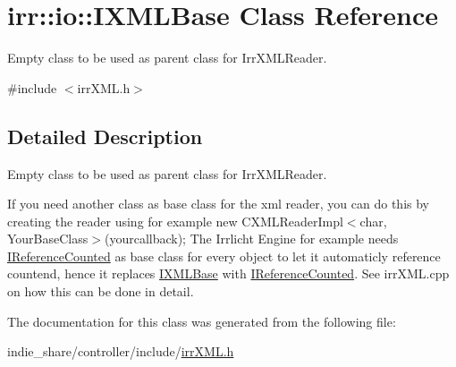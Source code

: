\hypertarget{classirr_1_1io_1_1IXMLBase}{}\section{irr\+:\+:io\+:\+:I\+X\+M\+L\+Base Class Reference}
\label{classirr_1_1io_1_1IXMLBase}


Empty class to be used as parent class for Irr\+X\+M\+L\+Reader.  




{\ttfamily \#include $<$irr\+X\+M\+L.\+h$>$}



\subsection{Detailed Description}
Empty class to be used as parent class for Irr\+X\+M\+L\+Reader. 

If you need another class as base class for the xml reader, you can do this by creating the reader using for example new C\+X\+M\+L\+Reader\+Impl$<$char, Your\+Base\+Class$>$(yourcallback); The Irrlicht Engine for example needs \hyperlink{classirr_1_1IReferenceCounted}{I\+Reference\+Counted} as base class for every object to let it automaticly reference countend, hence it replaces \hyperlink{classirr_1_1io_1_1IXMLBase}{I\+X\+M\+L\+Base} with \hyperlink{classirr_1_1IReferenceCounted}{I\+Reference\+Counted}. See irr\+X\+M\+L.\+cpp on how this can be done in detail. 

The documentation for this class was generated from the following file\+:\begin{DoxyCompactItemize}
\item 
indie\+\_\+share/controller/include/\hyperlink{irrXML_8h}{irr\+X\+M\+L.\+h}\end{DoxyCompactItemize}
